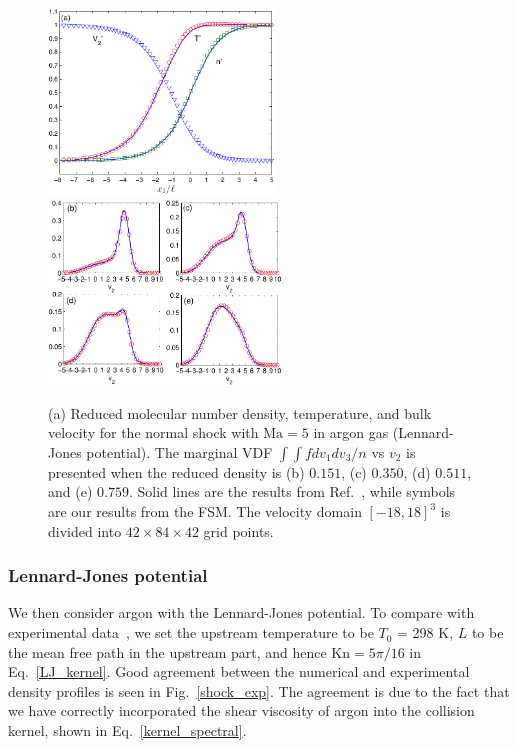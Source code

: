 \begin{figure}[t]
	\centering
	\includegraphics[width=6cm]{Chapter4/IMG/shock_M5_compare2.pdf} \hskip 0.5cm
	\includegraphics[width=6.2cm]{Chapter4/IMG/shock_LJ_M5_dist.pdf}
	\caption{
		(a) Reduced molecular number density, temperature, and bulk velocity for the normal shock with $\text{Ma}=5$ in argon gas (Lennard-Jones potential). The marginal VDF $\int\int fdv_1dv_3/n$ vs $v_2$ is presented when the reduced density is (b) $0.151$, (c) $0.350$, (d) $0.511$, and (e) $0.759$. Solid lines are the results from Ref.~\cite{Valentini2009}, while symbols are our results from the FSM. The velocity domain $[-18,18]^3$ is divided into $42\times84\times42$ grid points. }
	\label{shock_MD}
\end{figure}



\subsubsection{Lennard-Jones potential}

We then consider argon with the Lennard-Jones  potential. To compare with experimental data~\cite{Kowalczyk2008}, we set the upstream temperature to be $T_0$ = 298 K, $L$ to be the mean free path in the upstream part,
and hence $\text{Kn}=5\pi/16$ in Eq.~\eqref{LJ_kernel}. Good agreement between the numerical and experimental density profiles is seen in Fig.~\ref{shock_exp}. The agreement is due to the fact that we have correctly incorporated the shear viscosity of argon into the collision kernel, shown in Eq.~\eqref{kernel_spectral}. 


